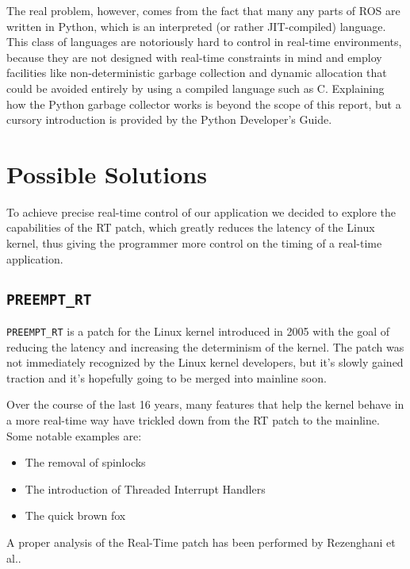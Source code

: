 \documentclass[a4paper,12pt]{report}
\begin{document}
The real problem, however, comes from the fact that many any parts of ROS are written in Python, which is an interpreted (or rather JIT-compiled) language. This class of languages are notoriously hard to control in real-time environments, because they are not designed with real-time constraints in mind and employ facilities like non-deterministic garbage collection and dynamic allocation that could be avoided entirely by using a compiled language such as C. Explaining how the Python garbage collector works is beyond the scope of this report, but a cursory introduction is provided by the Python Developer's Guide\cite{python-devguide-gc}.

\section{Possible Solutions}

To achieve precise real-time control of our application we decided to explore the capabilities of the RT patch, which greatly reduces the latency of the Linux kernel, thus giving the programmer more control on the timing of a real-time application.

\subsection{\texttt{PREEMPT\_RT}}

\texttt{PREEMPT\_RT} is a patch for the Linux kernel introduced in 2005 with the goal of reducing the latency and increasing the determinism of the kernel. The patch was not immediately recognized by the Linux kernel developers, but it's slowly gained traction and it's hopefully going to be merged into mainline soon.\cite{lwn-rt-future}

Over the course of the last 16 years, many features that help the kernel behave in a more real-time way have trickled down from the RT patch to the mainline. Some notable examples are:

\begin{itemize}
    \item The removal of spinlocks
    \item The introduction of Threaded Interrupt Handlers
    \item The quick brown fox
\end{itemize}

A proper analysis of the Real-Time patch has been performed by Rezenghani et al.\cite{survey-preempt-rt}.
\end{document}
